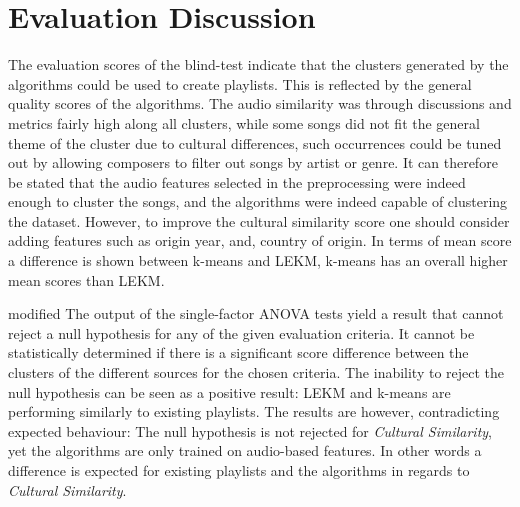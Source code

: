 \documentclass[../report.tex]{subfiles}
\begin{document}
\section{Evaluation Discussion}
The evaluation scores of the blind-test indicate that the clusters generated by the algorithms could be used to create playlists. This is reflected by the general quality scores of the algorithms. The audio similarity was through discussions and metrics fairly high along all clusters, while some songs did not fit the general theme of the cluster due to cultural differences, such occurrences could be tuned out by allowing composers to filter out songs by artist or genre. It can therefore be stated that the audio features selected in the preprocessing were indeed enough to cluster the songs, and the algorithms were indeed capable of clustering the dataset. However, to improve the cultural similarity score one should consider adding features such as origin year, and, country of origin. In terms of mean score a difference is shown between k-means and LEKM, k-means has an overall higher mean scores than LEKM.


\begin{color}{modified}
The output of the single-factor ANOVA tests yield a result that cannot reject a null hypothesis for any of the given evaluation criteria. It cannot be statistically determined if there is a significant score difference between the clusters of the different sources for the chosen criteria. The inability to reject the null hypothesis can be seen as a positive result: LEKM and k-means are performing similarly to existing playlists. The results are however, contradicting expected behaviour: The null hypothesis is not rejected for \textit{Cultural Similarity}, yet the algorithms are only trained on audio-based features. In other words a difference is expected for existing playlists and the algorithms in regards to \textit{Cultural Similarity}.
\end{color}
\end{document}
